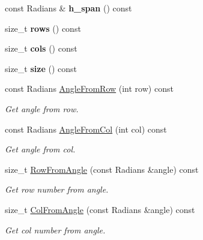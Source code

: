\begin{DoxyCompactItemize}
\item 
\mbox{\label{classdepth__clustering_1_1ProjectionParams_a343c14dff436227958fcb8e942572824}} 
const Radians \& {\bfseries h\+\_\+span} () const
\item 
\mbox{\label{classdepth__clustering_1_1ProjectionParams_ac2946ba352a7a50845510f9c2d7a8db6}} 
size\+\_\+t {\bfseries rows} () const
\item 
\mbox{\label{classdepth__clustering_1_1ProjectionParams_a3032c858ad3c2302a089c56d43f818a3}} 
size\+\_\+t {\bfseries cols} () const
\item 
\mbox{\label{classdepth__clustering_1_1ProjectionParams_a891cc1c1f8be0aa996f4caabfb13c39d}} 
size\+\_\+t {\bfseries size} () const
\item 
const Radians \hyperlink{classdepth__clustering_1_1ProjectionParams_adc48aa54d8c0c1da8167ab4001a83131}{Angle\+From\+Row} (int row) const
\begin{DoxyCompactList}\small\item\em Get angle from row. \end{DoxyCompactList}\item 
const Radians \hyperlink{classdepth__clustering_1_1ProjectionParams_aa5cf587adef5383e263a4e9a20de50ff}{Angle\+From\+Col} (int col) const
\begin{DoxyCompactList}\small\item\em Get angle from col. \end{DoxyCompactList}\item 
size\+\_\+t \hyperlink{classdepth__clustering_1_1ProjectionParams_ac9f61c77accaec1b6b60da0afe2dcf5e}{Row\+From\+Angle} (const Radians \&angle) const
\begin{DoxyCompactList}\small\item\em Get row number from angle. \end{DoxyCompactList}\item 
size\+\_\+t \hyperlink{classdepth__clustering_1_1ProjectionParams_a76d3be24f6c166bc5567d622e4a4995b}{Col\+From\+Angle} (const Radians \&angle) const
\begin{DoxyCompactList}\small\item\em Get col number from angle. \end{DoxyCompactList}\item 

\end{DoxyCompactItemize}
